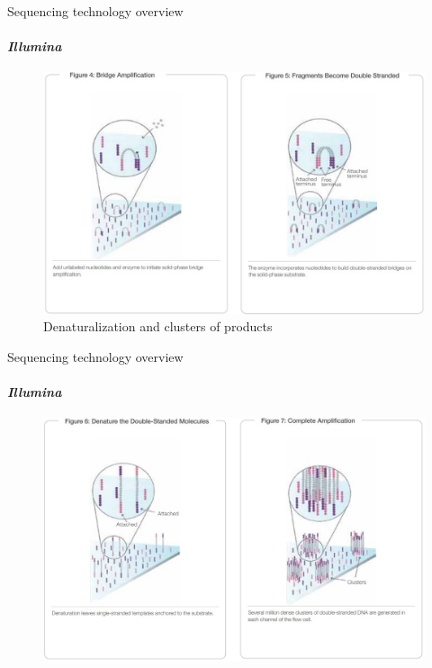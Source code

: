\documentclass{if-beamer}
\begin{document}
\begin{frame}{Sequencing technology overview}
\framesubtitle{\emph{Illumina}}
\begin{figure}
\centering
\includegraphics[scale=0.2]{illumina2.jpg}
\caption{Denaturalization and clusters of products} 
\end{figure}
\end{frame}
\begin{frame}{Sequencing technology overview}
\framesubtitle{\emph{Illumina}}
\begin{figure}
\centering
\includegraphics[scale=0.2]{illumina3.jpg}
\end{figure}
\end{frame}
\end{document}
